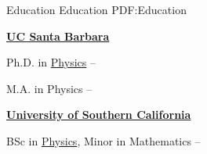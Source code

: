 \documentclass[letterpaper,MMMyyyy,nonstopmode]{simpleresumecv}
\begin{document}
\begin{Body}


\Section
{Education}
{Education}
{PDF:Education}
\begin{Detail}
\Entry
\href{http://www.ucsb.edu}
{\textbf{UC Santa Barbara}}

\Gap
\BulletItem
Ph.D. in
\href{http://web.physics.ucsb.edu/~astrogroup/}
{Physics}
\hfill
{} --


\Gap
\BulletItem
M.A. in Physics
\hfill
{} --


\BigGap
\Entry
\href{http://www.usc.edu}
{\textbf{University of Southern California}}

\Gap
\BulletItem
BSc in 
\href{https://dornsife.usc.edu/physics/}
{Physics}, Minor in Mathematics
\hfill
{} --
\end{Detail}





\end{Body}
\end{document}
